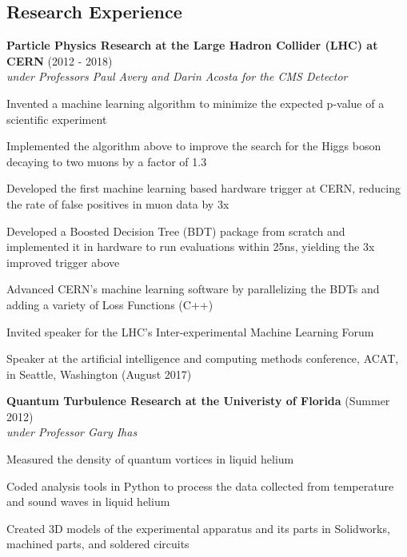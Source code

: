 \begin{resume}
    \section{\mysidestyle Research Experience}
    {\bf Particle Physics Research at the Large Hadron Collider (LHC) at CERN} (2012 - 2018)\\\vspace{2mm}%
    \textit{under Professors Paul Avery and Darin Acosta for the CMS Detector}
    \begin{stuff}
        \vspace*{1mm}
                \item Invented a machine learning algorithm to minimize the expected p-value of a scientific experiment
                \item Implemented the algorithm above to improve the search for the Higgs boson decaying to two muons by a factor of 1.3 
                \item Developed the first machine learning based hardware trigger at CERN, reducing the rate of false positives in muon data by 3x
                \item Developed a Boosted Decision Tree (BDT) package from scratch and implemented it in hardware to run evaluations within 25ns, yielding the 3x improved trigger above 
                \item Advanced CERN's machine learning software by parallelizing the BDTs and adding a variety of Loss Functions (C++)
                \item Invited speaker for the LHC's Inter-experimental Machine Learning Forum
                \item Speaker at the artificial intelligence and computing methods conference, ACAT, in Seattle, Washington (August 2017)
                                           
    \end{stuff}

    {\bf Quantum Turbulence Research at the Univeristy of Florida} (Summer 2012)\\\vspace{2mm}%
    \textit{under Professor Gary Ihas}
    \begin{stuff}
        \vspace*{1mm}
                \item Measured the density of quantum vortices in liquid helium
                \item Coded analysis tools in Python to process the data collected from temperature and sound waves in liquid helium
		\item Created 3D models of the experimental apparatus and its parts in Solidworks, machined parts, and soldered circuits
    \end{stuff}


\end{resume}
